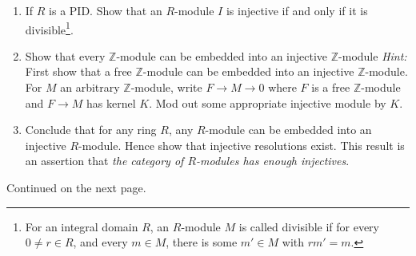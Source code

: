 \documentclass[11pt]{amsart}
\theoremstyle{theorem}
\renewcommand{\to}[1][]{\xrightarrow{\ #1\ }}
\newcommand{\bZ}{\mathbb{Z}}
\begin{document}
\begin{enumerate}
\vskip 6pt
\item If $R$ is a PID.  Show that an $R$-module $I$ is injective if and only if it is divisible\footnote{For an integral domain $R$, an $R$-module $M$ is called divisible if for every $0 \neq r \in R$, and every $m \in M$, there is some $m' \in M$ with $rm' = m$.}.
    \vskip 6pt
\item Show that every $\bZ$-module can be embedded into an injective $\bZ$-module
\vskip 3pt
\emph{Hint: } First show that a free $\bZ$-module can be embedded into an injective $\bZ$-module.  For $M$ an arbitrary $\bZ$-module, write $F \to M \to 0$ where $F$ is a free $\bZ$-module and $F \to M$ has kernel $K$.  Mod out some appropriate injective module by $K$.
\vskip 6pt
\item Conclude that for any ring $R$, any $R$-module can be embedded into an injective $R$-module.  Hence show that injective resolutions exist.  This result is an assertion that \emph{the category of $R$-modules has enough injectives}.
\end{enumerate}
Continued on the next page.
\end{document}
